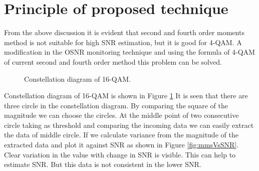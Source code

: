 \documentclass[12pt]{report}
\begin{document}
\section{Principle of proposed technique}
From the above discussion it is evident that second and fourth order moments method is not suitable for high SNR estimation, but it is good for 4-QAM. A modification in the OSNR monitoring technique and using the formula of 4-QAM of current second and fourth order method this problem can be solved.
\begin{figure}[htbp]
	\caption{Constellation diagram of 16-QAM.}
	\label{fig:qam16-constallation}
\end{figure}
Constellation diagram of 16-QAM is shown in Figure \ref{fig:qam16-constallation} It is seen that there are three circle in the constellation diagram. By comparing the square of the magnitude we can choose the circles. At the middle point of two consecutive circle taking as threshold and comparing the incoming data we can easily extract the data of  middle circle. If we calculate variance from the magnitude of the extracted data and plot it against SNR as shown in Figure \ref{fig:mmsVsSNR}. Clear variation in the value with change in SNR is visible. This can help to estimate SNR. But this data is not consistent in the lower SNR.
\end{document}
